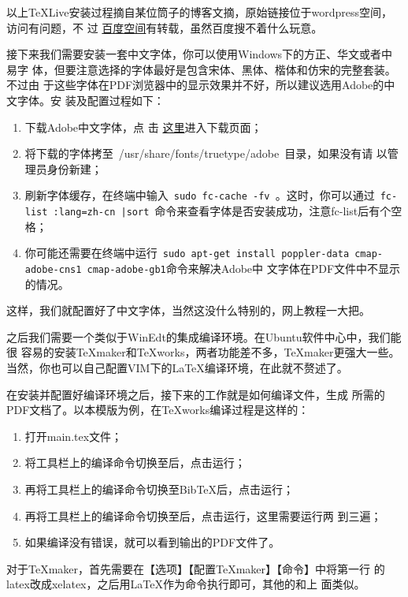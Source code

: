以上\TeX{}Live安装过程摘自某位筒子的博客文摘，原始链接位于wordpress空间，
访问有问题，不
过
\href{http://hi.baidu.com/skubuntu/blog/item/89e8de2f73a465e08a1399a3.html}{
  百度空间}有转载，虽然百度搜不着什么玩意。

接下来我们需要安装一套中文字体，你可以使用Windows下的方正、华文或者中易字
体，但要注意选择的字体最好是包含宋体、黑体、楷体和仿宋的完整套装。不过由
于这些字体在PDF浏览器中的显示效果并不好，所以建议选用Adobe的中文字体。安
装及配置过程如下：
\begin{enumerate}
\item 下载Adobe中文字体，点
  击
  \href{http://forum.ubuntu.org.cn/viewtopic.php?f=35&t=180987&start=0}{
    这里}进入下载页面；
\item 将下载的字体拷至~{/usr/share/fonts/truetype/adobe}~目录，如果没有请
  以管理员身份新建；
\item 刷新字体缓存，在终端中输入~\texttt{\footnotesize sudo fc-cache -fv }。这时，你可以通过~\texttt{\footnotesize fc-list :lang=zh-cn |sort}~命令来查看字体是否安装成功，注意fc-list后有个空格；
\item 你可能还需要在终端中运行~\texttt{\footnotesize sudo apt-get
    install poppler-data cmap-adobe-cns1 cmap-adobe-gb1}命令来解决Adobe中
  文字体在PDF文件中不显示的情况。
\end{enumerate}
这样，我们就配置好了中文字体，当然这没什么特别的，网上教程一大把。

之后我们需要一个类似于WinEdt的集成编译环境。在Ubuntu软件中心中，我们能很
容易的安装\TeX{}maker和\TeX{}works，两者功能差不多，\TeX{}maker更强大一些。
当然，你也可以自己配置VIM下的\LaTeX{}编译环境，在此就不赘述了。



在安装并配置好编译环境之后，接下来的工作就是如何编译\XeLaTeX{}文件，生成
所需的PDF文档了。以本模版为例，在\TeX{}works编译过程是这样的：
\begin{enumerate}
\item 打开main.tex文件；
\item 将工具栏上的编译命令切换至\XeLaTeX{}后，点击运行；
\item 再将工具栏上的编译命令切换至Bib\TeX{}后，点击运行；
\item 再将工具栏上的编译命令切换至\XeLaTeX{}后，点击运行，这里需要运行两
  到三遍；
\item 如果编译没有错误，就可以看到输出的PDF文件了。
\end{enumerate}

对于\TeX{}maker，首先需要在【选项】【配置\TeX{}maker】【命令】中将第一行
的latex改成xelatex，之后用\LaTeX{}作为\XeLaTeX{}命令执行即可，其他的和上
面类似。

